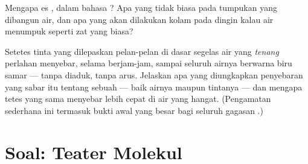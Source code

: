 \begin{exercise}[$\star\star$]\label{exo:g7:states-of-matter:11}
Mengapa es , dalam bahasa ? Apa yang tidak biasa pada
tumpukan yang dibangun  air, dan apa yang akan dilakukan kolam
pada  dingin kalau air menumpuk seperti zat yang biasa?
\end{exercise}

\begin{exercise}[$\star\star\star$]\label{exo:g7:states-of-matter:12}
Setetes tinta yang dilepaskan pelan-pelan di dasar segelas air yang
\emph{tenang} perlahan menyebar, selama berjam-jam, sampai seluruh
airnya berwarna biru samar --- tanpa diaduk, tanpa arus. Jelaskan apa
yang diungkapkan penyebaran yang sabar itu tentang  sebuah  --- baik  airnya maupun  tintanya --- dan mengapa
tetes yang sama menyebar lebih cepat di air yang hangat. (Pengamatan
sederhana ini termasuk bukti awal yang besar bagi seluruh gagasan
.)
\end{exercise}

\section{Soal: Teater Molekul}

